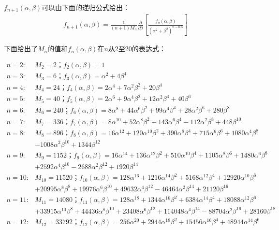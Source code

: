 $f_{n+1}(\alpha,\beta)$可以由下面的递归公式给出：
\begin{align*}
f_{n+1}(\alpha,\beta)=\frac{1}{(n+1)M_n }\frac{\partial}{\partial\beta}\left[\frac{f_n(\alpha,\beta)}{(\alpha^2+\beta^2)^{n-0.5}}\right] 
\end{align*}

下面给出了$M_n$的值和$f_{n}(\alpha,\beta)$在$n$从2至20的表达式：
\begin{flushleft}
\begin{align*}
n=2:&M_2=2；f_2(\alpha,\beta)=1 \\
n=3:&M_3=6；f_3(\alpha,\beta)=\alpha^2+4\beta^4 \\ 
n=4:&M_4=24；f_4(\alpha,\beta)=2\alpha^4+7\alpha^2\beta^2+20\beta^4 \\ 
n=5:&M_5=40；f_5(\alpha,\beta)=2\alpha^6+9\alpha^4\beta^2+12\alpha^2\beta^4+40\beta^6 \\ 
n=6:&M_6=240；f_6(\alpha,\beta)=8\alpha^8+44\alpha^6\beta^2+99\alpha^4\beta^4+28\alpha^2\beta^6+280\beta^8 \\ 
n=7:&M_7=336；f_7(\alpha,\beta)=8\alpha^{10}+52\alpha^8\beta^2+143\alpha^6\beta^4-112\alpha^2\beta^8+448\beta^{10} \\ 
n=8:&M_8=896；f_8(\alpha,\beta)=16\alpha^{12}+120\alpha^{10}\beta^2+390\alpha^8\beta^4+715\alpha^6\beta^6+1080\alpha^4\beta^8\\ &-1008\alpha^2\beta^{10}+1344\beta^{12}\\
n=9:&M_9=1152；f_9(\alpha,\beta)=16\alpha^{14}+136\alpha^{12}\beta^2+510\alpha^{10}\beta^4+1105\alpha^8\beta^6+1480\alpha^6\beta^8\\ &+2592\alpha^4\beta^{10}-2688\alpha^2\beta^{12}+1920\beta^{14}\\
n=10:&M_{10}=11520；f_{10}(\alpha,\beta)=128\alpha^{16}+1216\alpha^{14}\beta^2+5168\alpha^{12}\beta^4+12920\alpha^{10}\beta^6\\ &+20995\alpha^8\beta^{8}+19976\alpha^6\beta^{10}+49632\alpha^4\beta^{12}-46464\alpha^2\beta^{14}+21120\beta^{16} \\ 
n=11:&M_{11}=14080；f_{11}(\alpha,\beta)=128\alpha^{18}+1344\alpha^{16}\beta^2+6384\alpha^{14}\beta^4+18088\alpha^{12}\beta^6\\ 
&+33915\alpha^{10}\beta^{8}+44436\alpha^8\beta^{10}+23408\alpha^6\beta^{12}+114048\alpha^4\beta^{14}-88704\alpha^2\beta^{16}+28160\beta^{18}\\
n=12:&M_{12}=33792；f_{12}(\alpha,\beta)=256\alpha^{20}+2944\alpha^{18}\beta^2+15456\alpha^{16}\beta^4+48944\alpha^{14}\beta^6\\ 

\end{align*}
\end{flushleft}
